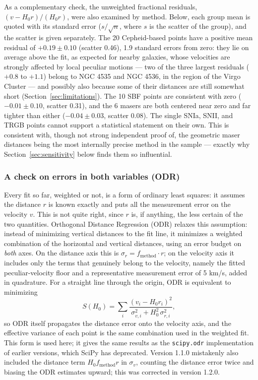 \documentclass[11pt]{article}
\begin{document}
As a complementary check, the unweighted fractional residuals, $(v - H_0 r)/(H_0 r)$, were also examined by method. Below, each group mean is quoted with its standard error ($s/\sqrt{n}$, where $s$ is the scatter of the group), and the scatter is given separately. The 20 Cepheid-based points have a positive mean residual of $+0.19 \pm 0.10$ (scatter 0.46), 1.9 standard errors from zero: they lie on average above the fit, as expected for nearby galaxies, whose velocities are strongly affected by local peculiar motions --- two of the three largest residuals ($+0.8$ to $+1.1$) belong to NGC 4535 and NGC 4536, in the region of the Virgo Cluster --- and possibly also because some of their distances are still somewhat short (Section~\ref{sec:limitations}). The 10 SBF points are consistent with zero ($-0.01 \pm 0.10$, scatter 0.31), and the 6 masers are both centered near zero and far tighter than either ($-0.04 \pm 0.03$, scatter 0.08). The single SNIa, SNII, and TRGB points cannot support a statistical statement on their own. This is consistent with, though not strong independent proof of, the geometric maser distances being the most internally precise method in the sample --- exactly why Section~\ref{sec:sensitivity} below finds them so influential.

\subsubsection{A check on errors in both variables (ODR)}
Every fit so far, weighted or not, is a form of ordinary least squares: it assumes the distance $r$ is known exactly and puts all the measurement error on the velocity $v$. This is not quite right, since $r$ is, if anything, the less certain of the two quantities. Orthogonal Distance Regression (ODR) relaxes this assumption: instead of minimizing vertical distances to the fit line, it minimizes a weighted combination of the horizontal and vertical distances, using an error budget on \emph{both} axes. On the distance axis this is $\sigma_r = f_{\text{method}} \cdot r$; on the velocity axis it includes only the terms that genuinely belong to the velocity, namely the fitted peculiar-velocity floor and a representative measurement error of 5 km/s, added in quadrature. For a straight line through the origin, ODR is equivalent to minimizing
\begin{equation}
S(H_0) = \sum_i \frac{(v_i - H_0 r_i)^2}{\sigma_{v,i}^2 + H_0^2\,\sigma_{r,i}^2},
\end{equation}
so ODR itself propagates the distance error onto the velocity axis, and the effective variance of each point is the same combination used in the weighted fit. This form is used here; it gives the same results as the \texttt{scipy.odr} implementation of earlier versions, which SciPy has deprecated. Version 1.1.0 mistakenly also included the distance term $H_0 f_{\text{method}} r$ in $\sigma_v$, counting the distance error twice and biasing the ODR estimates upward; this was corrected in version 1.2.0.
\end{document}
